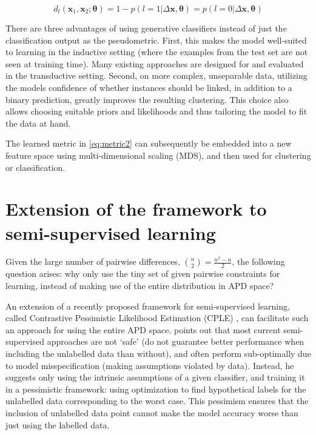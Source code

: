 \begin{equation}
\label{eq:metric2}
d_l(\boldsymbol x_1, \boldsymbol x_2; \boldsymbol{\theta}) = 1 - p(l=1|\Delta \boldsymbol x, \boldsymbol{\theta}) = p(l=0|\Delta \boldsymbol x, \boldsymbol{\theta})
\end{equation}

There are three advantages of using generative classifiers instead of just the classification output as the pseudometric. First, this makes the model well-suited to learning in the inductive setting (where the examples from the test set are not seen at training time). Many existing approaches are designed for and evaluated in the transductive setting. Second, on more complex, unseparable data, utilizing the models confidence of whether instances should be linked, in addition to a binary prediction, greatly improves the resulting clustering. This choice also allows choosing suitable priors and likelihoods and thus tailoring the model to fit the data at hand.

The learned metric in \eqref{eq:metric2} can subsequently be embedded into a new feature space using multi-dimensional scaling (MDS), and then used for clustering or classification.

\section{Extension of the framework to semi-supervised learning}

Given the large number of pairwise differences, ${n \choose 2}=\frac{n^2-n}{2}$, the following question arises: why only use the tiny set of given pairwise constraints for learning, instead of making use of the entire distribution in APD space?

An extension of a recently proposed framework for semi-supervised learning, called Contrastive Pessimistic Likelihood Estimation (CPLE) \citep{loog2015contrastive}, can facilitate such an approach for using the entire APD space. \cite{loog2015contrastive} points out that most current semi-supervised approaches are not `safe' (do not guarantee better performance when including the unlabelled data than without), and often perform sub-optimally due to model misspecification (making assumptions violated by data). Instead, he suggests only using the intrinsic assumptions of a given classifier, and training it in a pessimistic framework: using optimization to find hypothetical labels for the unlabelled data corresponding to the worst case. This pessimism ensures that the inclusion of unlabelled data point cannot make the model accuracy worse than just using the labelled data. 


